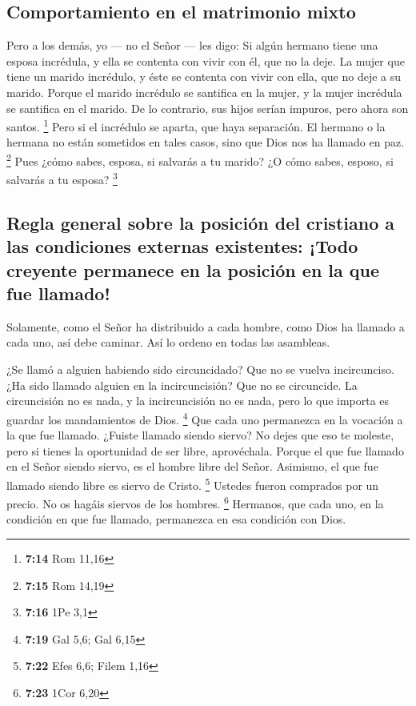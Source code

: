 \hypertarget{comportamiento-en-el-matrimonio-mixto}{%
\subsection{Comportamiento en el matrimonio
mixto}\label{comportamiento-en-el-matrimonio-mixto}}

 Pero a los demás, yo --- no el Señor --- les digo: Si
algún hermano tiene una esposa incrédula, y ella se contenta con vivir
con él, que no la deje.  La mujer que tiene un marido
incrédulo, y éste se contenta con vivir con ella, que no deje a su
marido.  Porque el marido incrédulo se santifica en la
mujer, y la mujer incrédula se santifica en el marido. De lo contrario,
sus hijos serían impuros, pero ahora son santos. \footnote{\textbf{7:14}
  Rom 11,16}  Pero si el incrédulo se aparta, que haya
separación. El hermano o la hermana no están sometidos en tales casos,
sino que Dios nos ha llamado en paz. \footnote{\textbf{7:15} Rom 14,19}
 Pues ¿cómo sabes, esposa, si salvarás a tu marido? ¿O
cómo sabes, esposo, si salvarás a tu esposa? \footnote{\textbf{7:16} 1Pe
  3,1}

\hypertarget{regla-general-sobre-la-posiciuxf3n-del-cristiano-a-las-condiciones-externas-existentes-todo-creyente-permanece-en-la-posiciuxf3n-en-la-que-fue-llamado}{%
\subsection{Regla general sobre la posición del cristiano a las
condiciones externas existentes: ¡Todo creyente permanece en la posición
en la que fue
llamado!}\label{regla-general-sobre-la-posiciuxf3n-del-cristiano-a-las-condiciones-externas-existentes-todo-creyente-permanece-en-la-posiciuxf3n-en-la-que-fue-llamado}}

 Solamente, como el Señor ha distribuido a cada hombre,
como Dios ha llamado a cada uno, así debe caminar. Así lo ordeno en
todas las asambleas.

 ¿Se llamó a alguien habiendo sido circuncidado? Que no
se vuelva incircunciso. ¿Ha sido llamado alguien en la incircuncisión?
Que no se circuncide.  La circuncisión no es nada, y la
incircuncisión no es nada, pero lo que importa es guardar los
mandamientos de Dios. \footnote{\textbf{7:19} Gal 5,6; Gal 6,15}
 Que cada uno permanezca en la vocación a la que fue
llamado.  ¿Fuiste llamado siendo siervo? No dejes que eso
te moleste, pero si tienes la oportunidad de ser libre, aprovéchala.
 Porque el que fue llamado en el Señor siendo siervo, es
el hombre libre del Señor. Asimismo, el que fue llamado siendo libre es
siervo de Cristo. \footnote{\textbf{7:22} Efes 6,6; Filem 1,16}
 Ustedes fueron comprados por un precio. No os hagáis
siervos de los hombres. \footnote{\textbf{7:23} 1Cor 6,20}
 Hermanos, que cada uno, en la condición en que fue
llamado, permanezca en esa condición con Dios.

